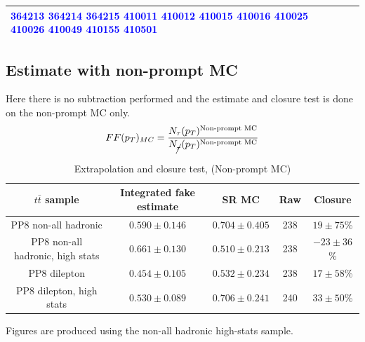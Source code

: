 \documentclass[11pt]{article}
\begin{document}
\begin{table}[htp]
\begin{center}
\begin{tabular}{|l|p{10cm}|}
\textcolor{blue}{364213} \textcolor{blue}{364214} \textcolor{blue}{364215} \textcolor{blue}{410011} \textcolor{blue}{410012} \textcolor{blue}{410015} \textcolor{blue}{410016} \textcolor{blue}{410025} \textcolor{blue}{410026} \textcolor{blue}{410049} \textcolor{blue}{410155} \textcolor{blue}{410501}\\
			\hline
			\end{tabular}
		\end{center}
		\label{mc_samples}
	\end{table}





	\clearpage
	\subsection{Estimate with non-prompt MC} 
	Here there is no subtraction performed and the estimate and closure test is done on the non-prompt MC only. 
	\begin{equation}
		FF(p_T)_{MC} = \frac{N_\tau (p_T)^{\text{Non-prompt MC}}}{N_{\cancel{\tau}} (p_T)^{\text{Non-prompt MC}}}
	\end{equation}


	\begin{table}[htp]
	\caption{Extrapolation and closure test, (Non-prompt MC)}
	\begin{center}
	\begin{tabular}{|c|c|c|c|c|}
	\hline
	$t\bar{t}$ sample 	& Integrated fake estimate	& SR MC		& Raw		& 	 Closure \\
	\hline
	PP8 non-all hadronic			& 	$0.590\pm0.146$ 		& $0.704\pm0.405$ 		& 238	&  $19\pm75$\% \\
	PP8 non-all hadronic, high stats	& 	$0.661\pm0.130$ 		& $0.510\pm0.213$ 		& 238	&  $-23\pm36$\% \\
	PP8 dilepton 					& 	$0.454\pm0.105$ 		& $0.532\pm0.234$ 		& 238	&  $17\pm58$\% \\
	PP8 dilepton, high stats			& 	$0.530\pm0.089$ 		& $0.706\pm0.241$ 		& 240	&  $33\pm50$\% \\
	\hline
	\end{tabular}
	\end{center}
	\label{default}
	\end{table}%

	Figures are produced using the non-all hadronic high-stats sample. 
\end{document}
